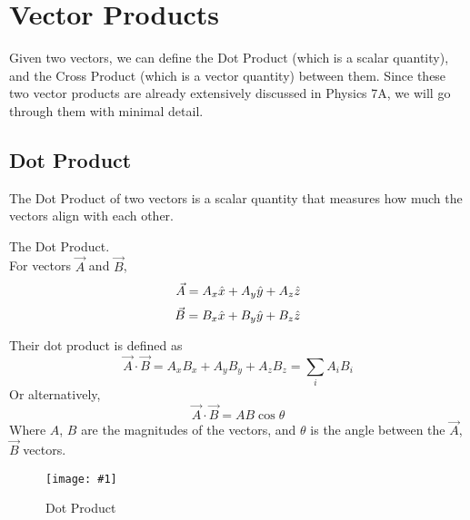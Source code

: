 \documentclass[11pt]{article}
\newcommand{\fig}[4]{
    \begin{figure}[H]
        \centering
        \texttt{[image: \#1]}
        \caption{#2}
        \label{exp4fit}
    \end{figure}
}
\theoremstyle{gangnamstyle}{\newtheorem{definition}{Definition}[]}
\theoremstyle{gangnamstyle}{\newtheorem{example}{Example}[]}
\theoremstyle{gangnamstyle}{\newtheorem{problem}{Problem}[]}
\begin{document}
\section{Vector Products}

Given two vectors, we can define the Dot Product (which is a scalar quantity), and the Cross Product (which is a vector quantity) between them. Since these two vector products are already extensively discussed in Physics 7A, we will go through them with minimal detail. 

\subsection{Dot Product}

The Dot Product of two vectors is a scalar quantity that measures how much the vectors align with each other. 

\begin{definition}
The Dot Product. \\
For vectors $\Vec{A}$ and $\Vec{B}$, 
\begin{equation}
\Vec{A} = A_x\Hat{x} + A_y\Hat{y} + A_z\Hat{z}
\end{equation}
\begin{equation}
\Vec{B} = B_x\Hat{x} + B_y\Hat{y} + B_z\Hat{z}
\end{equation}

Their dot product is defined as
\begin{equation}
\Vec{A} \cdot \Vec{B} = A_xB_x + A_yB_y + A_zB_z = \sum_i A_iB_i
\end{equation}
Or alternatively, 
\begin{equation}
\Vec{A} \cdot \Vec{B} = AB \cos\theta
\end{equation}
Where $A$, $B$ are the magnitudes of the vectors, and $\theta$ is the angle between the $\Vec{A}$, $\Vec{B}$ vectors. 
\end{definition}

\fig{../discussions/figs/0711/dot.png}{Dot Product}{0.4}{0} 

\pagebreak
\end{document}
